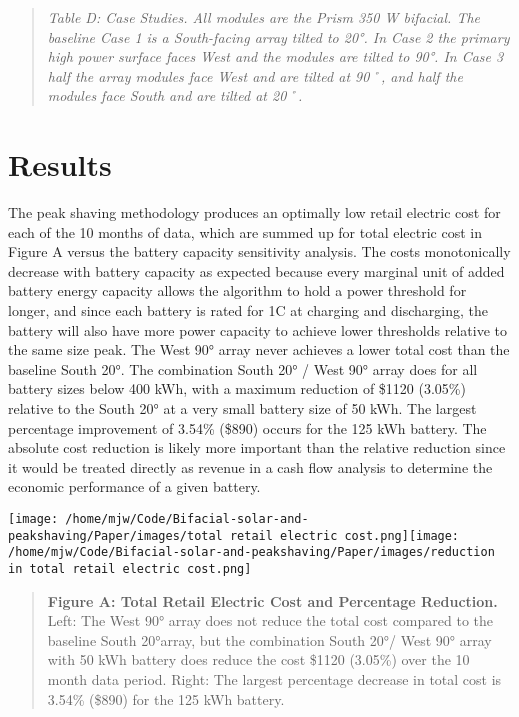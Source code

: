\documentclass[
]{article}
\begin{document}
\begin{quote}
\emph{Table D: Case Studies. All modules are the Prism 350 W bifacial.
The baseline Case 1 is a South-facing array tilted to 20°. In Case 2 the
primary high power surface faces West and the modules are tilted to 90°.
In Case 3 half the array modules face West and are tilted at 90˚, and
half the modules face South and are tilted at 20˚.}
\end{quote}

\hypertarget{results}{%
\section{Results}\label{results}}

The peak shaving methodology produces an optimally low retail electric
cost for each of the 10 months of data, which are summed up for total
electric cost in Figure A versus the battery capacity sensitivity
analysis. The costs monotonically decrease with battery capacity as
expected because every marginal unit of added battery energy capacity
allows the algorithm to hold a power threshold for longer, and since
each battery is rated for 1C at charging and discharging, the battery
will also have more power capacity to achieve lower thresholds relative
to the same size peak. The West 90° array never achieves a lower total
cost than the baseline South 20°. The combination South 20° / West 90°
array does for all battery sizes below 400 kWh, with a maximum reduction
of \$1120 (3.05\%) relative to the South 20° at a very small battery
size of 50 kWh. The largest percentage improvement of 3.54\% (\$890)
occurs for the 125 kWh battery. The absolute cost reduction is likely
more important than the relative reduction since it would be treated
directly as revenue in a cash flow analysis to determine the economic
performance of a given battery.

\texttt{[image: /home/mjw/Code/Bifacial-solar-and-peakshaving/Paper/images/total retail electric cost.png]}\texttt{[image: /home/mjw/Code/Bifacial-solar-and-peakshaving/Paper/images/reduction in total retail electric cost.png]}

\begin{quote}
\textbf{Figure A: Total Retail Electric Cost and Percentage Reduction.}
Left: The West 90° array does not reduce the total cost compared to the
baseline South 20°array, but the combination South 20°/ West 90° array
with 50 kWh battery does reduce the cost \$1120 (3.05\%) over the 10
month data period. Right: The largest percentage decrease in total cost
is 3.54\% (\$890) for the 125 kWh battery.
\end{quote}
\end{document}
